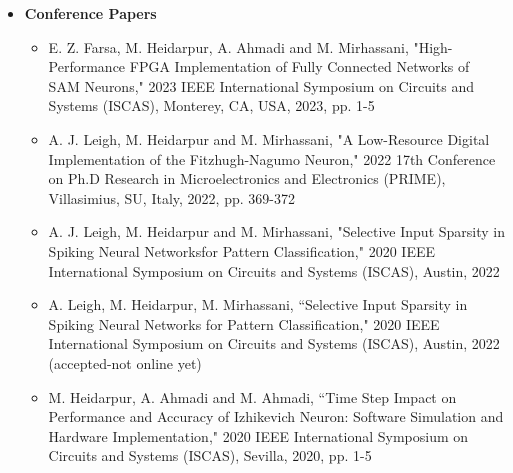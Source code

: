 \begin {itemize}
\begin {itemize}
\begin {itemize}
                    \vspace{0.3cm}
                     \item [-]   M. Heidarpur, A.~Ahmadi, N.~Kandalaft,``An Efficient Digital Implementation of 2D Hindmarsh-Rose Neuron", Nonlinear Dynamics, vol. 89, no. 3, pp. 1–14, Aug
                     \vspace{0.3cm}
                \end {itemize} \vspace{0.3cm}
         \item [$\bullet$] \bf {\mtf \normalsize Conference Papers} \mdseries
                \begin {itemize}
                    \item [-]  E. Z. Farsa, M. Heidarpur, A. Ahmadi and M. Mirhassani, "High-Performance FPGA Implementation of Fully Connected Networks of SAM Neurons," 2023 IEEE International Symposium on Circuits and Systems (ISCAS), Monterey, CA, USA, 2023, pp. 1-5
                    \vspace{0.3cm}
                    \item [-]  A. J. Leigh, M. Heidarpur and M. Mirhassani, "A Low-Resource Digital Implementation of the Fitzhugh-Nagumo Neuron," 2022 17th Conference on Ph.D Research in Microelectronics and Electronics (PRIME), Villasimius, SU, Italy, 2022, pp. 369-372
                    \vspace{0.3cm}
                    \item [-]  A. J. Leigh, M. Heidarpur and M. Mirhassani, "Selective Input Sparsity in Spiking Neural Networksfor Pattern Classification," 2020 IEEE International Symposium on Circuits and Systems (ISCAS), Austin, 2022
                    \vspace{0.3cm}
                    \item [-]  A. Leigh, M. Heidarpur, M. Mirhassani, ``Selective Input Sparsity in Spiking Neural Networks for Pattern Classification," 2020 IEEE International Symposium on Circuits and Systems (ISCAS), Austin, 2022 (accepted-not online yet)
                    \vspace{0.3cm}
                    \item [-]  M. Heidarpur, A. Ahmadi and M. Ahmadi, ``Time Step Impact on Performance and Accuracy of Izhikevich Neuron: Software Simulation and Hardware Implementation," 2020 IEEE International Symposium on Circuits and Systems (ISCAS), Sevilla, 2020, pp. 1-5
                    \vspace{0.3cm}

\end{itemize}
\end{itemize}
\end{itemize}

